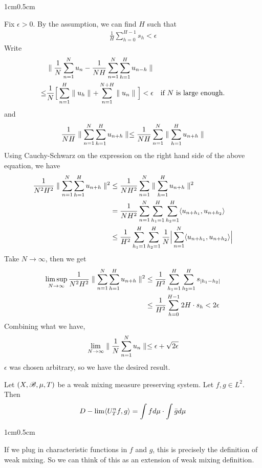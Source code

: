 \documentclass[10pt,a4paper]{report}
\newenvironment{proof}
{\begin{changemargin}{1cm}{0.5cm} 
	}%
	{\end{changemargin}
}
\begin{document}
\begin{proof}
\pf Fix $\epsilon >0$. By the assumption, we can find $H$ such that
\begin{align*}
\frac{1}{H} \sum_{h=0}^{H-1} s_h <\epsilon
\end{align*}
Write
\begin{align*}
& \parallel \frac{1}{N} \sum_{n=1}^N u_n - \frac{1}{NH} \sum_{n=1}^N \sum_{h=1}^H u_{n-h}  \parallel_{} \\ 
\leq &\frac{1}{N} \Big[ \sum_{n=1}^H \parallel u_h \parallel_{} + \sum_{n=1}^{N+H} \parallel u_n \parallel_{} \Big] < \epsilon \quad \text{if $N$ is large enough.}
\end{align*}
and
\begin{align*}
\frac{1}{NH} \parallel \sum_{n=1}^N \sum_{h=1}^H u_{n+h} \parallel_{} \leq \frac{1}{NH} \sum_{n=1}^N \parallel \sum_{h=1}^H u_{n+h} \parallel_{}
\end{align*}
Using Cauchy-Schwarz on the expression on the right hand side of the above equation, we have
\begin{align*}
\frac{1}{N^2 H^2} \parallel \sum_{n=1}^N \sum_{h=1}^H u_{n+h} \parallel_{}^2 &\leq \frac{1}{N H^2} \sum_{n=1}^N \parallel \sum_{h=1}^H u_{n+h} \parallel_{}^2 \\
& = \frac{1}{NH^2} \sum_{n=1}^N \sum_{h_1=1}^H \sum_{h_2 =1}^H \langle u_{n+h_1}, u_{n+h_2} \rangle \\
& \leq \frac{1}{H^2} \sum_{h_1=1}^H \sum_{h_2 =1}^H \frac{1}{N} \Big| \sum_{n=1}^N \langle u_{n+h_1} , u_{n+h_2} \rangle  \Big|
\end{align*}
Take $N\rightarrow \infty$, then we get
\begin{align*}
\limsup_{N \rightarrow \infty} \frac{1}{N^2 H^2} \parallel \sum_{n=1}^N \sum_{h=1}^H u_{n+h} \parallel_{}^2 &\leq \frac{1}{H^2} \sum_{h_1 =1}^H \sum_{h_2=1}^H s_{|h_1 - h_2|} \\
&\leq \frac{1}{H^2} \sum_{h=0}^{H-1} 2H \cdot s_h < 2\epsilon
\end{align*}
Combining what we have,
\begin{align*}
\lim_{N\rightarrow \infty} \parallel \frac{1}{N} \sum_{n=1}^N u_n \parallel_{} \leq \epsilon + \sqrt{2\epsilon}
\end{align*}
$\epsilon$ was chosen arbitrary, so we have the desired result.

\eop
\end{proof}
\s

\lem Let $(X,\mathscr{B}, \mu, T)$ be a weak mixing measure preserving system. Let $f,g\in L^2$. Then
\begin{align*}
D-\lim \langle U^n_T f,g\rangle = \int f d\mu \cdot \int \bar{g} d\mu 
\end{align*}
\begin{proof}
If we plug in characteristic functions in $f$ and $g$, this is precisely the definition of weak mixing. So we can think of this as an extension of weak mixing definition.
\end{proof}
\end{document}
